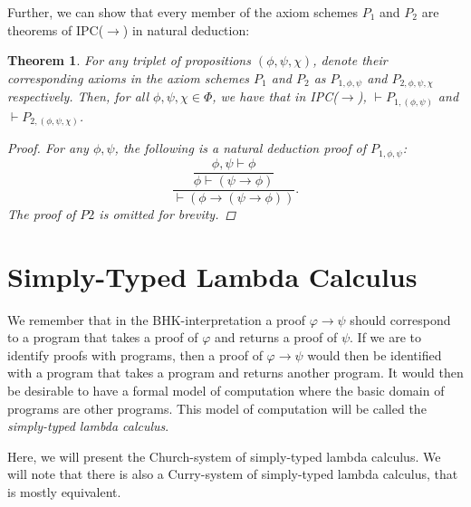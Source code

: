 \documentclass[12pt]{article}
\newtheorem{theorem}{Theorem}
\begin{document}
Further, we can show that every member of the axiom schemes $P_1$ and $P_2$ are theorems of IPC($\to$) in natural deduction: 
\begin{theorem}
For any triplet of propositions $(\phi, \psi,\chi)$, denote their corresponding axioms in the axiom schemes $P_1$ and $P_2$
as $P_{1,\phi,\psi}$ and $P_{2,\phi,\psi,\chi}$ respectively.  
Then, for all $\phi,\psi,\chi\in\Phi$, we have that in IPC($\to$), $\vdash P_{1,(\phi,\psi)}$ and $\vdash P_{2,(\phi,\psi,\chi)}$. 
\begin{proof}
For any $\phi,\psi$, the following is a natural deduction proof of $P_{1,\phi,\psi}$:
$$\frac{\dfrac{\phi ,\psi \vdash \phi }{\phi \vdash (\psi \to \phi )}}{\vdash (\phi \to (\psi \to \phi ))}.$$
The proof of $P2$ is omitted for brevity.
\end{proof}
\end{theorem} 

\section{Simply-Typed Lambda Calculus}
We remember that in the BHK-interpretation a proof $\varphi\to\psi$ should correspond 
to a program that takes a proof of $\varphi$ and returns a proof of $\psi$. 
If we are to identify proofs with programs, then a proof of $\varphi\to\psi$ would then
be identified with a program that takes a program and returns another program. 
It would then be desirable to have a formal model of computation where the basic domain of programs
are other programs. 
This model of computation will be called the \textit{simply-typed lambda calculus}. 

Here, we will present the Church-system of simply-typed lambda calculus. 
We will note that there is also a Curry-system of simply-typed lambda calculus,
that is mostly equivalent. 
\end{document}
